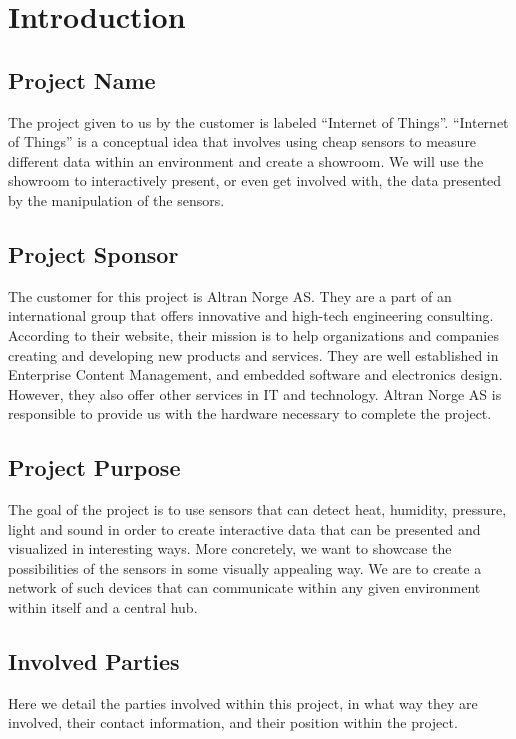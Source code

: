 \documentclass[../document.tex]{subfiles}
\begin{document}
\section*{Introduction}

\subsection*{Project Name}
The project given to us by the customer is labeled “Internet of Things”. “Internet of Things” is a conceptual idea that involves using cheap sensors to measure different data within an environment and create a showroom. We will use the showroom to interactively present, or even get involved with, the data presented by the manipulation of the sensors.

\subsection*{Project Sponsor}
The customer for this project is Altran Norge AS. They are a part of an international group that offers innovative and high-tech engineering consulting. According to their website, their mission is to help organizations and companies creating and developing new products and services. They are well established in Enterprise Content Management, and embedded software and electronics design. However, they also offer other services in IT and technology. Altran Norge AS is responsible to provide us with the hardware necessary to complete the project.

\subsection*{Project Purpose}
The goal of the project is to use sensors that can detect heat, humidity, pressure, light and sound in order to create interactive data that can be presented and visualized in interesting ways. More concretely, we want to showcase the possibilities of the sensors in some visually appealing way. We are to create a network of such devices that can communicate within any given environment within itself and a central hub.

\subsection*{Involved Parties}
Here we detail the parties involved within this project, in what way they are involved, their contact information, and their position within the project.
\end{document}
